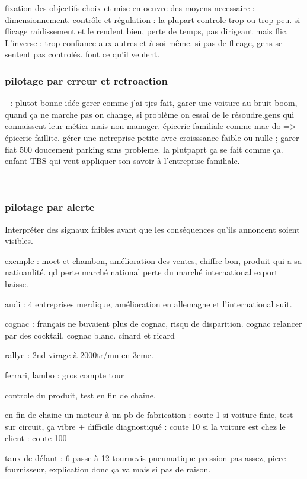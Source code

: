 \documentclass[a4paper,12pt]{article}
\begin{document}
fixation des objectifs
choix et mise en oeuvre des moyens necessaire : dimensionnement.
contrôle et régulation : la plupart controle trop ou trop peu. si flicage raidissement et le rendent bien, perte
de temps, pas dirigeant mais flic. L'inverse : trop confiance aux autres et à soi même. si pas de flicage, 
gens se sentent pas controlés. font ce qu'il veulent.


\subsubsection{pilotage par erreur et retroaction }
- : plutot bonne idée
gerer comme j'ai tjrs fait, garer une voiture au bruit boom, quand ça ne marche pas on change,
si problème on essai de le résoudre.gens qui connaissent leur métier mais non manager. épicerie familiale
comme mac do => épicerie faillite. 
gérer une netreprise petite avec croisssance faible ou nulle ; garer fiat 500 doucement parking sans probleme.
la plutpaprt ça se fait comme ça. enfant TBS qui veut appliquer son savoir à l'entreprise familiale.




-\subsubsection{pilotage par alerte} 
Interpréter des signaux faibles avant que les conséquences qu'ils annoncent soient visibles.

exemple : moet et chambon, amélioration des ventes, chiffre bon, produit qui a sa natioanlité.
qd perte marché national perte du marché international export baisse.

audi : 4 entreprises merdique, amélioration en allemagne et l'international suit.

cognac : français ne buvaient plus de cognac, risqu de disparition.
cognac relancer par des cocktail, cognac blanc.
cinard et ricard


rallye : 2nd virage à 2000tr/mn en 3eme.

ferrari, lambo : gros compte tour 

controle du produit, test en fin de chaine.

en fin de chaine un moteur à un pb de fabrication : coute 1
si voiture finie, test sur circuit, ça vibre + difficile diagnostiqué : coute 10
si la voiture est chez le client : coute 100


taux de défaut : 6 passe à 12  tournevis pneumatique pression pas assez, piece fournisseur, 
explication donc ça va mais si pas de raison.
\end{document}
